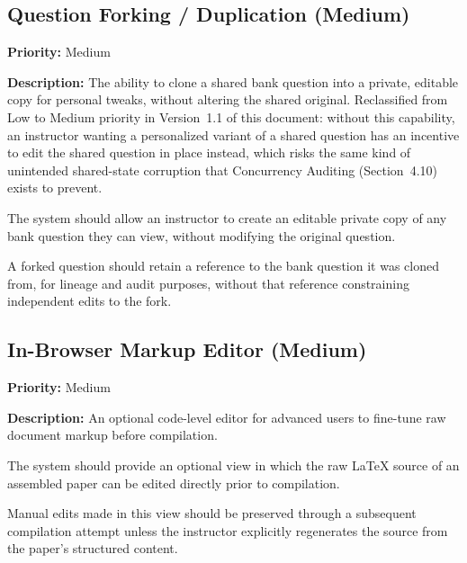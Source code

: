 \documentclass[11pt]{article}
\newcommand{\priority}[1]{\textbf{Priority:} #1}
\newcommand{\reqid}[1]{\textbf{#1}}
\begin{document}
\subsection{Question Forking / Duplication (Medium)}
\priority{Medium}

\textbf{Description:} The ability to clone a shared bank question into a
private, editable copy for personal tweaks, without altering the shared
original. Reclassified from Low to Medium priority in Version~1.1 of this
document: without this capability, an instructor wanting a personalized
variant of a shared question has an incentive to edit the shared question
in place instead, which risks the same kind of unintended shared-state
corruption that Concurrency Auditing (Section~4.10) exists to prevent.

\begin{description}[nosep,leftmargin=2.2cm]
  \item[\reqid{REQ-11.1}] The system should allow an instructor to create
    an editable private copy of any bank question they can view, without
    modifying the original question.
  \item[\reqid{REQ-11.2}] A forked question should retain a reference to
    the bank question it was cloned from, for lineage and audit purposes,
    without that reference constraining independent edits to the fork.
\end{description}

\subsection{In-Browser Markup Editor (Medium)}
\priority{Medium}

\textbf{Description:} An optional code-level editor for advanced users to
fine-tune raw document markup before compilation.

\begin{description}[nosep,leftmargin=2.2cm]
  \item[\reqid{REQ-12.1}] The system should provide an optional view in
    which the raw LaTeX source of an assembled paper can be edited directly
    prior to compilation.
  \item[\reqid{REQ-12.2}] Manual edits made in this view should be
    preserved through a subsequent compilation attempt unless the
    instructor explicitly regenerates the source from the paper's
    structured content.
\end{description}
\end{document}
